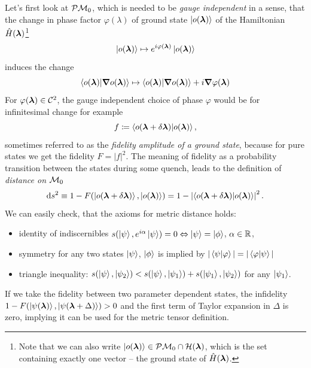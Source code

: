 Let's first look at $\mathcal{P}\mathcal{M}_0$, which is needed to be \emph{gauge independent} in a sense, that the change in phase factor $\varphi(\lambda)$ of ground state $\ket{o({\bm\lambda})}$ of the Hamiltonian $\hat{H}({\bm\lambda})$\footnote{Note that we can also write $\ket{o({\bm\lambda})}\in \mathcal{P}\mathcal{M}_0\cap \mathcal{H}({\bm\lambda})$, which is the set containing exactly one vector -- the ground state of $\hat{H}({\bm\lambda})$.}
\begin{equation}
    \ket{o({\bm\lambda})}\mapsto e^{i\varphi({\bm\lambda})} \ket{o({\bm\lambda})}
\end{equation}
 induces the change 
\begin{equation}
        \braket{o({\bm\lambda})|\bm \nabla o({\bm\lambda})}\mapsto \braket{o({\bm\lambda})|\bm \nabla o({\bm\lambda})} + i\bm \nabla \varphi({\bm\lambda}) 
\end{equation} 
For $\varphi({\bm\lambda})\in \mathcal C^2$, the gauge independent choice of phase $\varphi$ would be for infinitesimal change for example
\begin{equation}
    f\coloneqq \braket{o(\bm{{\bm\lambda}}+\delta\bm{{\bm\lambda}})|o(\bm{{\bm\lambda}})},
    \label{eq:fidelityDefinition}
\end{equation}
sometimes referred to as the \emph{fidelity amplitude of a ground state}, because for pure states we get the fidelity $F=|f|^2$. The meaning of fidelity as a probability transition between the states during some quench, leads to the definition of \emph{distance on $\mathcal{M}_0$}
\begin{equation}
    \mathrm{d} s^2 \equiv 1-F(\ket{o(\bm{{\bm\lambda}}+\delta\bm{{\bm\lambda}})},\ket{o({\bm\lambda})})= 1-\left|\braket{o(\bm{{\bm\lambda}}+\delta\bm{{\bm\lambda}})|o(\bm{{\bm\lambda}})}\right|^2.
    \label{eq:distanceOnM0}
\end{equation}
We can easily check, that the axioms for metric distance holds:
\begin{itemize}
    \item identity of indiscernibles $s(\ket{\psi},e^{i\alpha}\ket{\psi}) = 0 \Leftrightarrow \ket{\psi}=\ket{\phi}$, $\alpha\in\mathbb{R}$,
    \item symmetry for any two states $\ket{\psi}$, $\ket{\phi}$ is implied by $|\braket{\psi|\varphi}|=|\braket{\varphi|\psi}|$
    \item triangle inequality: $s(\ket{\psi},\ket{\psi_2}) <s(\ket{\psi},\ket{\psi_1}) + s(\ket{\psi_1},\ket{\psi_2})$ for any $\ket{\psi_1}$.
\end{itemize}
If we take the fidelity between two parameter dependent states, the infidelity $1-F(\ket{\psi({\bm\lambda})},\ket{\psi({\bm\lambda}+\Delta)})>0$ and the first term of Taylor expansion in $\Delta$ is zero, implying it can be used for the metric tensor definition.

